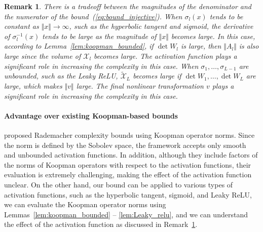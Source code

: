 \documentclass[twoside]{article}
\newtheorem{remark}[proposition]{Remark}
\def\mcl#1{\mathcal{#1}}
\def\eqref#1{(\ref{#1})}
\begin{document}
\begin{remark}\label{rem:tradeoff}
There is a tradeoff between the magnitudes of the denominator and the numerator of the bound~\eqref{eq:bound_injective}.
When $\sigma_l(x)$ tends to be constant as $\Vert x\Vert\to\infty$, such as the hyperbolic tangent and sigmoid, the derivative of $\sigma_l^{-1}(x)$ tends to be large as the magnitude of $\Vert x\Vert$ becomes large.
In this case, according to Lemma~\ref{lem:koopman_bounded}, if $\det{W_l}$ is large, then $\Vert A_l\Vert$ is also large since the volume of $\mcl{X}_l$ becomes large.
The activation function plays a significant role in increasing the complexity in this case.
When $\sigma_1,\ldots,\sigma_{L-1}$ are unbounded, such as the Leaky ReLU, $\tilde{\mcl{X}}_L$ becomes large if $\det{W_1},\ldots,\det{W_L}$ are large, which makes $\Vert v\Vert$ large.
The final nonlinear transformation $v$ plays a significant role in increasing the complexity in this case.
\end{remark}

\paragraph{Advantage over existing Koopman-based bounds}
\citet{hashimoto2024koopmanbased} proposed Rademacher complexity bounds using Koopman operator norms. 
Since the norm is defined by the Sobolev space, the framework accepts only smooth and unbounded activation functions.
In addition, although they include factors of the norms of Koopman operators with respect to the activation functions, their evaluation is extremely challenging, making the effect
of the activation function unclear.
On the other hand, our bound can be applied to various types of activation functions, such as the hyperbolic tangent, sigmoid, and Leaky ReLU, we can evaluate the Koopman operator norms using Lemmas~\ref{lem:koopman_bounded} -- \ref{lem:Leaky_relu}, and we can understand the effect of the activation function as discussed in Remark~\ref{rem:tradeoff}.
\end{document}
